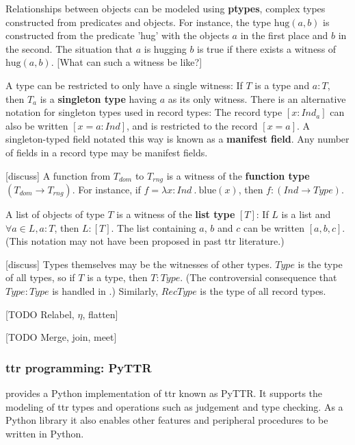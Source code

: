 Relationships between objects can be modeled using \textbf{ptypes}, complex types constructed from predicates and objects.
For instance, the type $\text{hug}(a,b)$ is constructed from the predicate 'hug' with the objects $a$ in the first place and $b$ in the second.
The situation that $a$ is hugging $b$ is true if there exists a witness of $\text{hug}(a,b)$.
[What can such a witness be like?]

A type can be restricted to only have a single witness:
If $T$ is a type and $a:T$, then $T_a$ is a \textbf{singleton type} having $a$ as its only witness.
There is an alternative notation for singleton types used in record types:
The record type $[x:Ind_a]$ can also be written $[x=a:Ind]$, and is restricted to the record $[x=a]$.
A singleton-typed field notated this way is known as a \textbf{manifest field}.
Any number of fields in a record type may be manifest fields.

[discuss] A function from $T_{dom}$ to $T_{rng}$ is a witness of the \textbf{function type} $(T_{dom} \rightarrow T_{rng})$.
For instance, if $f = \lambda x : Ind\ .\ \text{blue}(x)$, then $f : (Ind \rightarrow Type)$.

A list of objects of type $T$ is a witness of the \textbf{list type} $[T]$:
If $L$ is a list and $\forall a \in L, a : T$, then $L : [T]$.
The list containing $a$, $b$ and $c$ can be written $[a, b, c]$.
(This notation may not have been proposed in past \gls{ttr} literature.)

[discuss] Types themselves may be the witnesses of other types.
$Type$ is the type of all types, so if $T$ is a type, then $T : Type$.
(The controversial consequence that $Type : Type$ is handled in \citet[section 2.7]{CooperTypetheorysemantics2012}.)
Similarly, $RecType$ is the type of all record types.

[TODO Relabel, $\eta$, flatten]

[TODO Merge, join, meet]



\subsubsection{\gls{ttr} programming: PyTTR}
\label{sec:pyttr}

\cite{pyttr} provides a Python implementation of \gls{ttr} known as PyTTR.
It supports the modeling of \gls{ttr} types and operations such as judgement and type checking.
As a Python library it also enables other features and peripheral procedures to be written in Python.

